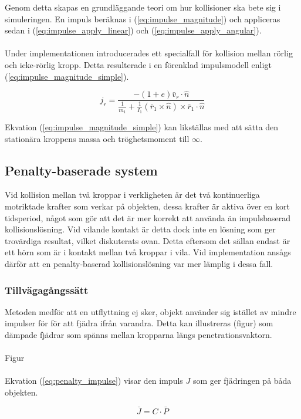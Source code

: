 \documentclass[a4paper,12pt,twopage,swedish]{article}
\begin{document}
Genom detta skapas en grundläggande teori om hur kollisioner ska bete sig i simuleringen. En impuls beräknas i (\ref{eq:impulse_magnitude}) och appliceras sedan i (\ref{eq:impulse_apply_linear}) och (\ref{eq:impulse_apply_angular}).
\\
\\Under implementationen introducerades ett specialfall för kollision mellan rörlig och icke-rörlig kropp. Detta resulterade i en förenklad impulsmodell enligt (\ref{eq:impulse_magnitude_simple}).

\begin{equation}\label{eq:impulse_magnitude_simple}
j_r = \frac{-(1+e)\bar{v}_r \cdot \hat{n}}
{\frac{1}{m_1}+\frac{1}{I_1}(\bar{r}_1 \times \hat{n}) \times \bar{r}_1 \cdot \hat{n}}
\end{equation}

Ekvation (\ref{eq:impulse_magnitude_simple}) kan likställas med att sätta den stationära kroppens massa och tröghetsmoment till $\infty$.

\subsection{Penalty-baserade system}
Vid kollision mellan två kroppar i verkligheten är det två kontinuerliga motriktade krafter som verkar på objekten, dessa krafter är aktiva över en kort tidsperiod, något som gör att det är mer korrekt att använda än impulsbaserad kollisionslösning.
Vid vilande kontakt är detta dock inte en lösning som ger trovärdiga resultat, vilket diskuterats ovan. Detta eftersom det sällan endast är ett hörn som är i kontakt mellan två kroppar i vila. Vid implementation ansågs därför att en penalty-baserad kollisionslösning var mer lämplig i dessa fall.

\subsubsection{Tillvägagångssätt}
Metoden medför att en utflyttning ej sker, objekt använder sig istället av mindre impulser för för att fjädra ifrån varandra. Detta kan illustreras (figur) som dämpade fjädrar som spänns mellan kropparna längs penetrationsvaktorn.
\\
\\Figur
\\
\\Ekvation (\ref{eq:penalty_impulse}) visar den impuls $J$ som ger fjädringen på båda objekten.

\begin{equation}\label{eq:penalty_impulse}
\bar{J} = C \cdot \bar{P}
\end{equation}
\end{document}
